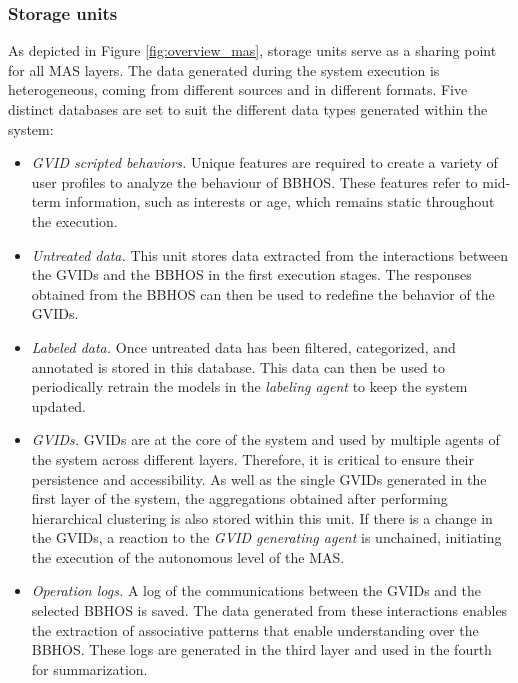 \subsubsection*{Storage units}
As depicted in Figure \ref{fig:overview_mas}, storage units serve as a sharing point for all MAS layers. The data generated during the system execution is heterogeneous, coming from different sources and in different formats. Five distinct databases are set to suit the different data types generated within the system:
\begin{itemize}
    \item \textit{GVID scripted behaviors.} Unique features are required to create a variety of user profiles to analyze the behaviour of BBHOS. These features refer to mid-term information, such as interests or age, which remains static throughout the execution.
    
    \item \textit{Untreated data.} This unit stores data extracted from the interactions between the GVIDs and the BBHOS in the first execution stages. The responses obtained from the BBHOS can then be used to redefine the behavior of the GVIDs.
    
    \item \textit{Labeled data.} Once untreated data has been filtered, categorized, and annotated is stored in this database. This data can then be used to periodically retrain the models in the \textit{labeling agent} to keep the system updated. 
    
    \item \textit{GVIDs.} GVIDs are at the core of the system and used by multiple agents of the system across different layers. Therefore, it is critical to ensure their persistence and accessibility. As well as the single GVIDs generated in the first layer of the system, the aggregations obtained after performing hierarchical clustering is also stored within this unit. If there is a change in the GVIDs, a reaction to the \textit{GVID generating agent} is unchained, initiating the execution of the autonomous level of the MAS.
    
    \item \textit{Operation logs.} A log of the communications between the GVIDs and the selected BBHOS is saved. The data generated from these interactions enables the extraction of associative patterns that enable understanding over the BBHOS. These logs are generated in the third layer and used in the fourth for summarization.
\end{itemize}

